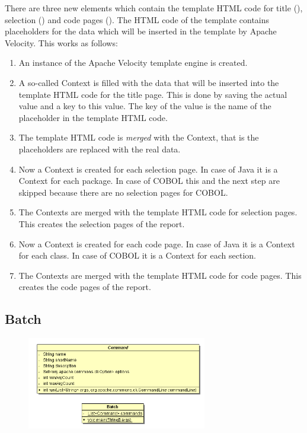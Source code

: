 There are three new elements which contain the template HTML code for title (), selection () and code pages (). The HTML code of the template contains placeholders for the data which will be inserted in the template by Apache Velocity. This works as follows:
\begin{enumerate}
\item An instance of the Apache Velocity template engine is created.
\item A so-called Context is filled with the data that will be inserted into the template HTML code for the title page. This is done by saving the actual value and a key to this value. The key of the value is the name of the placeholder in the template HTML code.
\item The template HTML code is \emph{merged} with the Context, that is the placeholders are replaced with the real data.
\item Now a Context is created for each selection page. In case of Java it is a Context for each package. In case of COBOL this and the next step are skipped because there are no selection pages for COBOL.
\item The Contexts are merged with the template HTML code for selection pages. This creates the selection pages of the report.
\item Now a Context is created for each code page. In case of Java it is a Context for each class. In case of COBOL it is a Context for each section.
\item The Contexts are merged with the template HTML code for code pages. This creates the code pages of the report.
\end{enumerate}

\fussy


\subsection{Batch}

\begin{figure}[hbtp]
 \centering
 \includegraphics[width=0.7\textwidth]{images/Batch/batch.png}
 \caption{}
 \label{figure:Classes:Batch}
\end{figure}

